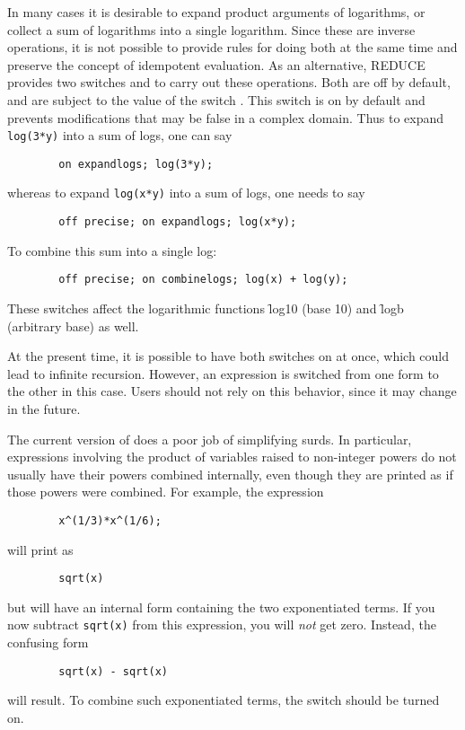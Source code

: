 \hypertarget{switch:COMBINELOGS}{}
\hypertarget{switch:EXPANDLOGS}{}
In many cases it is desirable to expand product arguments of logarithms,
or collect a sum of logarithms into a single logarithm.  Since these are
inverse operations, it is not possible to provide rules for doing both at
the same time and preserve the {\REDUCE} concept of idempotent evaluation.
As an alternative, REDUCE provides two switches
 and
 to carry
out these operations.  Both are off by default, and are subject
to the value of the switch . This switch is on
by default and prevents modifications that may be false in a complex domain.
Thus to expand \texttt{log(3*y)} into a sum of logs, one can say
\begin{verbatim}
        on expandlogs; log(3*y);
\end{verbatim}
whereas to expand \texttt{log(x*y)} into a sum of logs, one needs to say
\begin{verbatim}
        off precise; on expandlogs; log(x*y);
\end{verbatim}
To combine this sum into a single log:
\begin{verbatim}
        off precise; on combinelogs; log(x) + log(y);
\end{verbatim}

These switches affect the logarithmic functions \f{log10} (base 10) and \f{logb}
(arbitrary base) as well.

At the present time, it is possible to have both switches on at once,
which could lead to infinite recursion.  However, an expression is
switched from one form to the other in this case.  Users should not rely
on this behavior, since it may change in the future.

\hypertarget{switch:COMBINEEXPT}{}
The current version of {\REDUCE} does a poor job of simplifying surds.  In
particular, expressions involving the product of variables raised to
non-integer powers do not usually have their powers combined internally,
even though they are printed as if those powers were combined.  For
example, the expression
\begin{verbatim}
        x^(1/3)*x^(1/6);
\end{verbatim}
will print as
\begin{verbatim}
        sqrt(x)
\end{verbatim}
but will have an internal form containing the two exponentiated terms.
If you now subtract \texttt{sqrt(x)} from this expression, you will
\emph{not} get zero.  Instead, the confusing form
\begin{verbatim}
        sqrt(x) - sqrt(x)
\end{verbatim}
will result.  To combine such exponentiated terms, the switch
 should be turned on.

